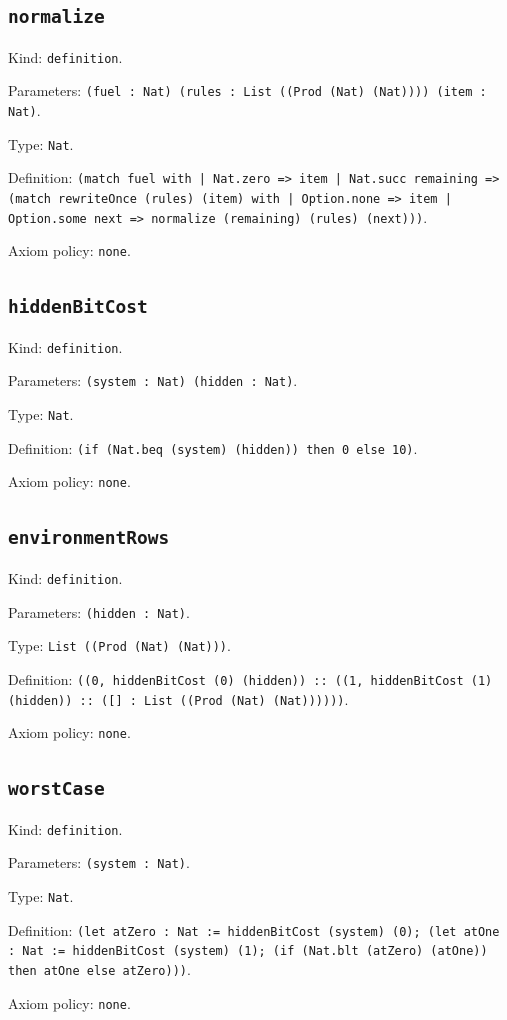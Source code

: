 \documentclass[11pt]{article}
\begin{document}
\subsection*{\texttt{normalize}}
\noindent Kind: \texttt{definition}.\par
\noindent Parameters: \texttt{(fuel : Nat) (rules : List ((Prod (Nat) (Nat)))) (item : Nat)}.\par
\noindent Type: \texttt{Nat}.\par
\noindent Definition: \texttt{(match fuel with | Nat.zero => item | Nat.succ remaining => (match rewriteOnce (rules) (item) with | Option.none => item | Option.some next => normalize (remaining) (rules) (next)))}.\par
\noindent Axiom policy: \texttt{none}.\par
\subsection*{\texttt{hiddenBitCost}}
\noindent Kind: \texttt{definition}.\par
\noindent Parameters: \texttt{(system : Nat) (hidden : Nat)}.\par
\noindent Type: \texttt{Nat}.\par
\noindent Definition: \texttt{(if (Nat.beq (system) (hidden)) then 0 else 10)}.\par
\noindent Axiom policy: \texttt{none}.\par
\subsection*{\texttt{environmentRows}}
\noindent Kind: \texttt{definition}.\par
\noindent Parameters: \texttt{(hidden : Nat)}.\par
\noindent Type: \texttt{List ((Prod (Nat) (Nat)))}.\par
\noindent Definition: \texttt{((0, hiddenBitCost (0) (hidden)) :: ((1, hiddenBitCost (1) (hidden)) :: ([] : List ((Prod (Nat) (Nat))))))}.\par
\noindent Axiom policy: \texttt{none}.\par
\subsection*{\texttt{worstCase}}
\noindent Kind: \texttt{definition}.\par
\noindent Parameters: \texttt{(system : Nat)}.\par
\noindent Type: \texttt{Nat}.\par
\noindent Definition: \texttt{(let atZero : Nat := hiddenBitCost (system) (0); (let atOne : Nat := hiddenBitCost (system) (1); (if (Nat.blt (atZero) (atOne)) then atOne else atZero)))}.\par
\noindent Axiom policy: \texttt{none}.\par
\end{document}
